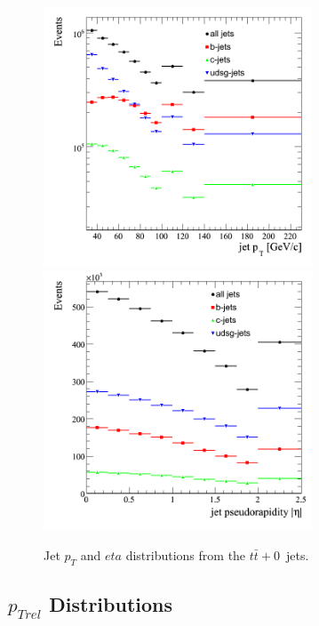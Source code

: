 \begin{figure}[htbp]
  \begin{center}
    \includegraphics[width=80mm]{Figures/jet_pt_tt0j.png}
    \includegraphics[width=80mm]{Figures/jet_eta_tt0j.png}
  \end{center}
  \caption{Jet $p_T$ and $eta$ distributions from the $t\bar{t}+0$~jets.}
  \label{fig:jet_pt_ttbar}
\end{figure}

\clearpage

\subsection{$p_{Trel}$ Distributions} 

